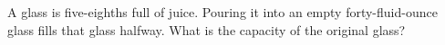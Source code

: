 A glass is five-eighths full of juice. Pouring it into an empty forty-fluid-ounce glass fills that glass halfway. What is the capacity of the original glass?
